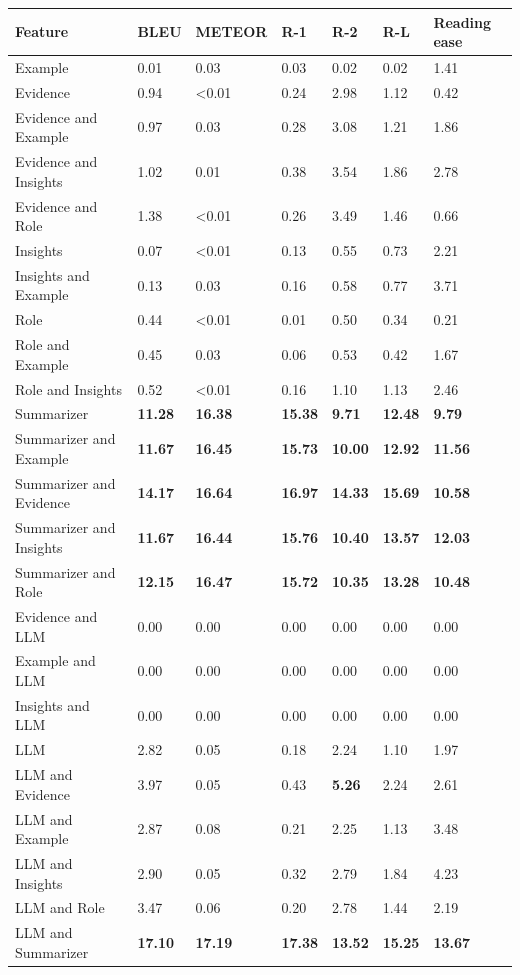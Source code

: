 \begin{tabular}{|l|l|l|l|l|l|l|}
\hline
\textbf{Feature} & BLEU & METEOR & R-1 & R-2 & R-L & Reading ease \\
 \hline
 Example & 0.01 & 0.03 & 0.03 & 0.02 & 0.02 & 1.41 \\
 \hline
 Evidence & 0.94 & \textless{}0.01 & 0.24 & 2.98 & 1.12 & 0.42 \\
 \hline
 Evidence and Example & 0.97 & 0.03 & 0.28 & 3.08 & 1.21 & 1.86 \\
 \hline
 Evidence and Insights & 1.02 & 0.01 & 0.38 & 3.54 & 1.86 & 2.78 \\
 \hline
 Evidence and Role & 1.38 & \textless{}0.01 & 0.26 & 3.49 & 1.46 & 0.66 \\
 \hline
 Insights & 0.07 & \textless{}0.01 & 0.13 & 0.55 & 0.73 & 2.21 \\
 \hline
 Insights and Example & 0.13 & 0.03 & 0.16 & 0.58 & 0.77 & 3.71 \\
 \hline
 Role & 0.44 & \textless{}0.01 & 0.01 & 0.50 & 0.34 & 0.21 \\
 \hline
 Role and Example & 0.45 & 0.03 & 0.06 & 0.53 & 0.42 & 1.67 \\
 \hline
 Role and Insights & 0.52 & \textless{}0.01 & 0.16 & 1.10 & 1.13 & 2.46 \\
 \hline
 Summarizer & \textbf{11.28} & \textbf{16.38} & \textbf{15.38} & \textbf{9.71} & \textbf{12.48} & \textbf{9.79} \\
 \hline
 Summarizer and Example & \textbf{11.67} & \textbf{16.45} & \textbf{15.73} & \textbf{10.00} & \textbf{12.92} & \textbf{11.56} \\
 \hline
 Summarizer and Evidence & \textbf{14.17} & \textbf{16.64} & \textbf{16.97} & \textbf{14.33} & \textbf{15.69} & \textbf{10.58} \\
 \hline
 Summarizer and Insights & \textbf{11.67} & \textbf{16.44} & \textbf{15.76} & \textbf{10.40} & \textbf{13.57} & \textbf{12.03} \\
 \hline
 Summarizer and Role & \textbf{12.15} & \textbf{16.47} & \textbf{15.72} & \textbf{10.35} & \textbf{13.28} & \textbf{10.48} \\
 \hline
 Evidence and LLM & 0.00 & 0.00 & 0.00 & 0.00 & 0.00 & 0.00 \\
 \hline
 Example and LLM & 0.00 & 0.00 & 0.00 & 0.00 & 0.00 & 0.00 \\
 \hline
 Insights and LLM & 0.00 & 0.00 & 0.00 & 0.00 & 0.00 & 0.00 \\
 \hline
 LLM & 2.82 & 0.05 & 0.18 & 2.24 & 1.10 & 1.97 \\
 \hline
 LLM and Evidence & 3.97 & 0.05 & 0.43 & \textbf{5.26} & 2.24 & 2.61 \\
 \hline
 LLM and Example & 2.87 & 0.08 & 0.21 & 2.25 & 1.13 & 3.48 \\
 \hline
 LLM and Insights & 2.90 & 0.05 & 0.32 & 2.79 & 1.84 & 4.23 \\
 \hline
 LLM and Role & 3.47 & 0.06 & 0.20 & 2.78 & 1.44 & 2.19 \\
 \hline
 LLM and Summarizer & \textbf{17.10} & \textbf{17.19} & \textbf{17.38} & \textbf{13.52} & \textbf{15.25} & \textbf{13.67} \\
\hline
\end{tabular}
